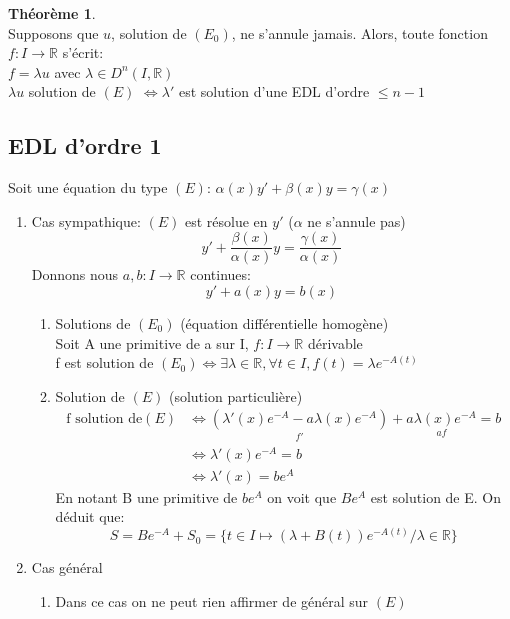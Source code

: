\documentclass[fleqn]{article}
\theoremstyle{definition} \newtheorem*{defi}{D\'efinition}
\theoremstyle{definition} \newtheorem*{theo}{Th\'eor\`eme}
\theoremstyle{remark} \newtheorem*{rqs}{Remarques}
\begin{document}
\begin{theo} $ $\\
	Supposons que $u$, solution de $(E_0)$, ne s'annule jamais. Alors, toute fonction $f: I \rightarrow \mathbb{R}$ s'\'ecrit:\\
	$f = \lambda u$ avec $\lambda \in D^n(I, \mathbb{R})$ \\
	$\lambda u$ solution de $(E)$ $\Leftrightarrow \lambda '$ est solution d'une EDL d'ordre $\leq n-1$
\end{theo}

\subsection{EDL d'ordre 1}
Soit une \'equation du type $(E)$: $\alpha(x)y' + \beta(x)y = \gamma(x)$

\begin{enumerate}
	\item Cas sympathique: $(E)$ est r\'esolue en $y'$ ($\alpha$ ne s'annule pas)
		\[y' + \frac{\beta(x)}{\alpha(x)}y = \frac{\gamma(x)}{\alpha(x)}\]
		Donnons nous $a, b : I \rightarrow \mathbb{R}$ continues:
		\[y' + a(x)y = b(x)\]
		\begin{enumerate}
			\item Solutions de $(E_0)$ (\'equation diff\'erentielle homog\`ene)\\
				Soit A une primitive de a sur I, $f: I \rightarrow \mathbb{R}$ d\'erivable\\
				f est solution de $(E_0) \Leftrightarrow \exists \lambda \in \mathbb{R}, \forall t \in I, f(t) = \lambda e^{-A(t)}$
			\item Solution de $(E)$ (solution particuli\`ere)
				\begin{align*}
					\text{f solution de} (E) &\Leftrightarrow \underset{f'}{(\lambda'(x) e^{-A} - a \lambda(x) e^{-A})} +
					\underset{af}{a \lambda(x) e^{-A}} = b\\
					&\Leftrightarrow \lambda'(x) e^{-A} = b \\
					&\Leftrightarrow \lambda'(x) = be^A
				\end{align*}
				En notant B une primitive de $be^A$ on voit que $Be^A$ est solution de E. On d\'eduit que:\\
				\[S = Be^{-A} + S_0 = \{t\in I \mapsto (\lambda + B(t))e^{-A(t)}/ \lambda \in \mathbb{R}\}\]
		\end{enumerate}
	\item Cas g\'en\'eral
		\begin{enumerate}
			\item Dans ce cas on ne peut rien affirmer de g\'en\'eral sur $(E)$

\end{enumerate}
\end{enumerate}
\end{document}
